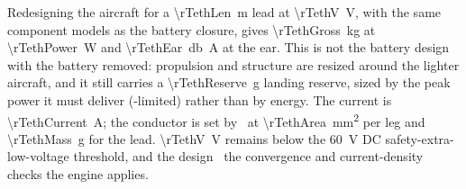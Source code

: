 Redesigning the aircraft for a \SI{\rTethLen}{\metre} lead at
\SI{\rTethV}{\volt}, with the same component models as the battery closure,
gives \SI{\rTethGross}{\kilo\gram} at \SI{\rTethPower}{\watt} and
\SI{\rTethEar}{\decibel A} at the ear. This is not the battery design with the
battery removed: propulsion and structure are resized around the lighter
aircraft, and it still carries a \SI{\rTethReserve}{\gram} landing reserve,
sized by the peak power it must deliver (\rTethResLimit-limited) rather than by
energy. The current is \SI{\rTethCurrent}{\ampere}; the conductor is set by
\rTethSizedBy\ at \SI{\rTethArea}{\milli\metre\squared} per leg and
\SI{\rTethMass}{\gram} for the lead. \SI{\rTethV}{\volt} remains below the
\SI{60}{\volt} DC safety-extra-low-voltage threshold, and the design
\rTethFeasible\ the convergence and current-density checks the engine applies.
